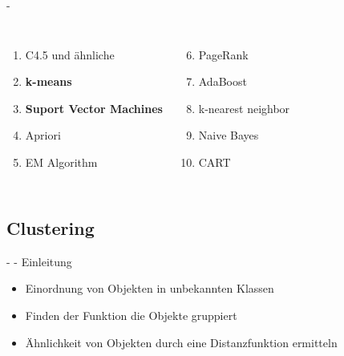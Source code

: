 \documentclass[fleqn,11pt,aspectratio=43]{beamer}
\begin{document}
\begin{frame}{\insertsectionhead - \insertsubsectionhead \cite{wu2008top}}
\begin{columns}[onlytextwidth]
		\begin{enumerate}[label=\bfseries\arabic*.]
		\item C4.5 und ähnliche
		\item \textbf{k-means}
		\item \textbf{Suport Vector Machines}
		\item Apriori
		\item EM Algorithm
		\end{enumerate}
	    \begin{enumerate}[label=\bfseries\arabic*.]
	    \setcounter{enumi}{5}
	    \item PageRank
	    \item AdaBoost
	    \item k-nearest neighbor
	    \item Naive Bayes
	    \item CART
	    \end{enumerate}
\end{columns}
\end{frame}

%

\subsection{Clustering~}

\begin{frame}{\insertsectionhead - \insertsubsectionhead - Einleitung \cite{ester2000knowledge}}
\begin{itemize}
\item Einordnung von Objekten in unbekannten Klassen
\item Finden der Funktion die Objekte gruppiert
\item Ähnlichkeit von Objekten durch eine Distanzfunktion ermitteln
\end{itemize}
\end{frame}
\end{document}
